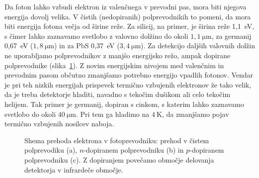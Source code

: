 Da foton lahko vzbudi elektron iz valenčnega v prevodni pas, mora biti njegova energija dovolj velika. 
V čistih (nedopiranih) polprevodnikih to pomeni, da mora biti energija fotona večja od 
širine reže. Za silicij, na primer, je širina reže 1,1~eV, 
s čimer lahko zaznavamo svetlobo z valovno dolžino do okoli 
$1,1~\si{\micro\meter}$, za germanij 0,67~eV ($1,8~\si{\micro\meter}$) in za PbS 0,37~eV
($3,4~\si{\micro\meter}$). 
Za detekcijo daljših valovnih dolžin ne uporabljamo polprevodnikov
z manjšo energijsko režo, ampak dopirane polprevodnike (slika~\ref{fig:FPrevodnik}). 
Z novim energijskim nivojem med valenčnim in prevodnim pasom občutno zmanjšamo 
potrebno energijo vpadlih fotonov. Vendar je pri teh nizkih energijah prispevek termično 
vzbujenih elektronov že tako velik, da je treba detektorje hladiti, navadno s tekočim
dušikom ali celo tekočim helijem. Tak primer je germanij, dopiran s cinkom, 
s katerim lahko zaznavamo svetlobo do okoli $40~\si{\micro\meter}$. Pri tem ga hladimo
na $4~\si{\kelvin}$, da zmanjšamo pojav termično vzbujenih nosilcev naboja. 
\begin{figure}[h]
\centering
\def\svgwidth{150truemm} 

\caption{Shema prehoda elektrona v fotoprevodniku: prehod v čistem polprevodiku (a), 
$n$-dopiranem polprevodniku (b) in $p$-dopiranem polprevodniku (c). 
Z dopiranjem povečamo območje delovanja detektorja v infrardeče območje. }
\label{fig:FPrevodnik}
\end{figure}

